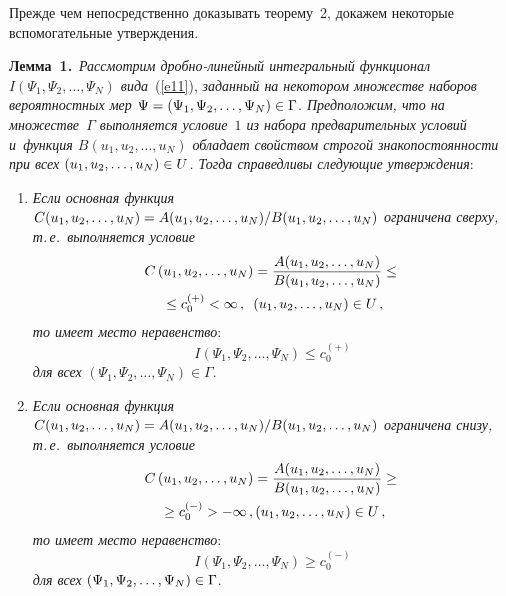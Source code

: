 \begin{multicols}{2}
\smallskip

Прежде чем непосредственно доказывать теорему~2, докажем некоторые 
вспомогательные утверждения.

\smallskip

\noindent
\textbf{Лемма~1.}\ 
\textit{Рассмотрим дроб\-но-ли\-ней\-ный интегральный функционал 
$I(\Psi_1, \Psi_2,\ldots, \Psi_N)$ вида}~(\ref{e11}), 
\textit{заданный на некотором множестве наборов вероятностных мер 
$\Psi\hm=(\Psi_1, \Psi_2,\ldots, \Psi_N)\hm \in \Gamma$. Предположим, что на 
множестве~$\Gamma$ выполняется условие~$1$ из набора предварительных условий 
и~функция $B(u_1, u_2,\ldots, u_N)$  обладает свойством строгой знакопостоянности 
при всех $(u_1, u_2,\ldots, u_N) \hm\in U$. Тогда справедливы следующие утверждения}:
\begin{enumerate}[1.]
\item \textit{Если основная функция 
$C(u_1, u_2,\ldots, u_N)\hm={A(u_1, u_2,\ldots, u_N)}/{B(u_1, u_2,\ldots, u_N)}$ 
ограничена сверху, т.\,е.\ выполняется условие}
\begin{multline}
C\left(u_1, u_2,\ldots, u_N\right)=
\displaystyle\frac{\displaystyle A(u_1, u_2,\ldots, u_N)\mathstrut}{\displaystyle B(u_1, u_2,\ldots, u_N)\mathstrut}\leq {}\\
{}\leq
c_0^{(+)}<\infty \,, \enskip \left(u_1, u_2,\ldots, u_N\right) \in U\,, \label{e25}
\end{multline}
\textit{то имеет место неравенство}:
\begin{equation}
I\left(\Psi_1, \Psi_2,\ldots, \Psi_N\right)\leq c_0^{(+)} 
\label{e26}
\end{equation}
\textit{для всех} $(\Psi_1, \Psi_2,\ldots, \Psi_N) \in \Gamma$.
\item \textit{Если основная функция 
$C(u_1, u_2,\ldots, u_N)\hm={A(u_1, u_2,\ldots, u_N)}/{B(u_1, u_2,\ldots, u_N)}$ 
ограничена снизу, т.\,е.\ выполняется условие}
\begin{multline*}
C\left(u_1, u_2,\ldots, u_N\right)=\displaystyle\frac{\displaystyle A(u_1, u_2,\ldots, u_N)\mathstrut}{\displaystyle B(u_1, u_2,\ldots, 
u_N)\mathstrut}\geq{}\\
{}\geq c_0^{(-)}>-\infty \,, 
\left(u_1, u_2,\ldots, u_N\right) \in U\,, 
\end{multline*}
\textit{то имеет место неравенство}:
\begin{equation*}
I\left(\Psi_1, \Psi_2,\ldots, \Psi_N\right)\geq c_0^{(-)} 
\end{equation*}
\textit{для всех} $(\Psi_1, \Psi_2,\ldots, \Psi_N) \hm\in \Gamma$.
\end{enumerate}


\end{multicols}

